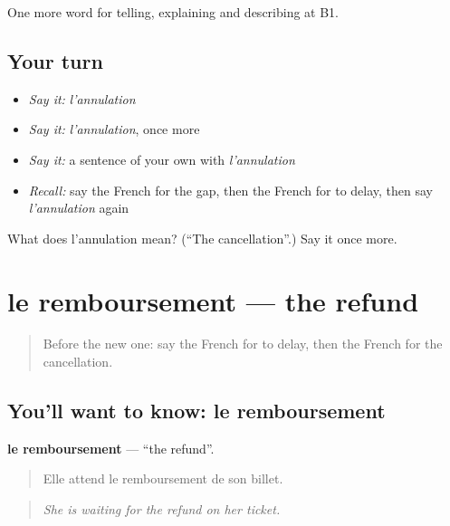 \begin{grammarlens}[title={What you've built}]
One more word for telling, explaining and describing at B1.
\end{grammarlens}

\subsection*{Your turn}
\begin{itemize}
\raggedright
  \item \emph{Say it:} \emph{l'annulation}
  \item \emph{Say it:} \emph{l'annulation}, once more
  \item \emph{Say it:} a sentence of your own with \emph{l'annulation}
  \item \emph{Recall:} say the French for the gap, then the French for to delay, then say \emph{l'annulation} again
\end{itemize}

\begin{tcolorbox}[breakable,colback=teal!4,colframe=teal!35!black,title={Before you move on}]
What does l'annulation mean? (\textquotedblleft{}The cancellation\textquotedblright{}.) Say it once more.
\end{tcolorbox}
\section[le remboursement]{le remboursement — the refund}

\label{lesson:FR-C421-remboursement}



\begin{quote}
Before the new one: say the French for to delay, then the French for the cancellation.
\end{quote}

\subsection*{You'll want to know: le remboursement}
\textbf{le remboursement} — \textquotedblleft{}the refund\textquotedblright{}.

\begin{quote}
Elle attend le remboursement de son billet.
\end{quote}

\begin{quote}
\emph{She is waiting for the refund on her ticket.}
\end{quote}

